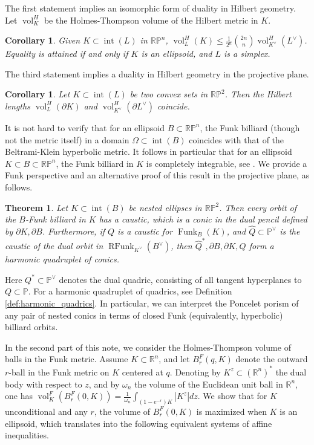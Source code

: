 \documentclass[reqno,10pt]{amsart}
\newcommand{\blue}{}
\newcounter{mt}
\newcounter{mc}
\newcounter{mp}
\newtheorem{MainTheorem}[mt]{Theorem}
\newtheorem{MainCorollary}[mc]{Corollary}
\DeclareMathOperator{\inter}{int}
\DeclareMathOperator{\vol}{vol}
\DeclareMathOperator{\Funk}{Funk}
\DeclareMathOperator{\RFunk}{RFunk}
\newcommand{\R}{\mathbb{R}}
\newcommand{\PP}{\mathbb{P}}
\begin{document}
The first statement implies an isomorphic form of duality in Hilbert geometry. Let $\vol_K^H$ be the Holmes-Thompson volume of the Hilbert metric in $K$.
\begin{MainCorollary}\label{cor:hilbert_volume} Given $K\subset \inter(L)$ in $\R\PP^n$,
	$\vol^H_L(K)\leq \frac{1}{2^n}{2n\choose n} \vol_{K^\vee}^H(L^\vee)$. 
	Equality is attained if and only if $K$ is an ellipsoid, and $L$ is a simplex.
\end{MainCorollary}
{\blue The third statement implies a duality in Hilbert geometry in the projective plane.
\begin{MainCorollary}\label{cor:hilbert_plane}
		Let $K\subset\inter(L)$ be two convex sets in $\R\PP^2$. Then the Hilbert lengths $\vol^H_L(\partial K)$ and $\vol^H_{K^\vee}(\partial L^\vee)$ coincide.
\end{MainCorollary}
}
It is not hard to verify that for an ellipsoid $B\subset\R\PP^n$, the Funk billiard  (though not the metric itself) in a domain $\Omega\subset \inter(B)$ coincides with that of the Beltrami-Klein hyperbolic metric. It follows in particular that for an ellipsoid $K\subset B\subset \R\mathbb P^n$, the Funk billiard in $K$ is completely integrable, see \cite{veselov}. We provide a Funk perspective and an alternative proof of this result in the projective plane, as follows.  

\begin{MainTheorem}\label{main:conics}
	Let $K\subset \inter(B)$ be nested ellipses in $\R\PP^2$. Then every orbit of the $B$-Funk billiard in $K$ has a caustic, which is a conic in the dual pencil defined by $\partial K, \partial B$. 
	Furthermore, if $Q$ is a caustic for $\Funk_B(K)$, and $\widehat Q\subset \mathbb P^\vee$ is the caustic of the dual orbit in $\RFunk_{K^\vee}(B^\vee)$, then $\widehat Q^*, \partial B, \partial K, Q$ form a harmonic quadruplet of conics. 
\end{MainTheorem}
Here  $Q^*\subset\mathbb P^\vee$ denotes the dual quadric, consisting of all tangent hyperplanes to $Q\subset\PP$. For a harmonic quadruplet of quadrics, see Definition \ref{def:harmonic_quadrics}. In particular, we can interpret the Poncelet porism of any pair of nested conics in terms of closed Funk (equivalently, hyperbolic) billiard orbits.

In the second part of this note, we consider the Holmes-Thompson volume of balls in the Funk metric.  Assume $K\subset\R^n$, and let $B_r^F(q, K)$ denote the outward $r$-ball in the Funk metric on $K$ centered at $q$. Denoting by $K^z\subset (\R^n)^*$ the dual body with respect to $z$, and by $\omega_n$ the volume of the Euclidean unit ball in $\R^n$, one has $\vol^{F}_K(B_r^F(0,K))=\frac{1}{\omega_n}\int_{(1-e^{-r})K}|K^z|dz$.  We show that for $K$ unconditional and any $r$, the volume of $B_r^F(0, K)$ is maximized when $K$ is an ellipsoid, which translates into the following equivalent systems of affine inequalities.
\end{document}
